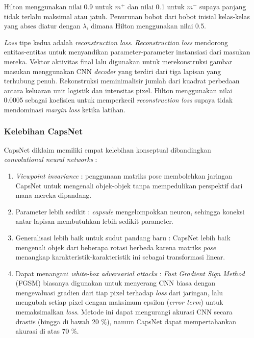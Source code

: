 \documentclass{article}
\begin{document}
		   	
		Hilton menggunakan nilai 0.9 untuk $m^{+}$ dan nilai 0.1 untuk $m^{-}$ supaya panjang tidak terlalu maksimal atau jatuh. Penurunan bobot dari bobot inisial kelas-kelas yang abses diatur dengan $\lambda$, dimana Hilton menggunakan nilai 0.5. 
	   	\par 
	   	\textit{Loss} tipe kedua adalah \textit{reconstruction loss}. \textit{Reconstruction loss} mendorong entitas-entitas untuk  menyandikan parameter-parameter instansiasi dari masukan mereka. Vektor aktivitas final lalu digunakan untuk merekonstruksi gambar masukan menggunakan CNN \textit{decoder} yang terdiri dari tiga lapisan yang terhubung penuh. Rekonstruksi meminimalisir jumlah dari kuadrat perbedaan antara keluaran unit logistik dan intensitas pixel. Hilton menggunakan nilai 0.0005 sebagai koefisien untuk memperkecil \textit{reconstruction loss} supaya tidak mendominasi \textit{margin loss} ketika latihan. 
	   	
	   	\subsubsection{Kelebihan CapsNet}
	   	CapsNet diklaim memiliki empat kelebihan konseptual dibandingkan \textit{convolutional neural networks} :
	   	
	   	\begin{enumerate}
	   	 \item \textit{Viewpoint invariance} : penggunaan matriks pose membolehkan jaringan CapsNet untuk mengenali objek-objek tanpa mempedulikan perspektif dari mana mereka dipandang.
	   	 \item Parameter lebih sedikit : \textit{capsule} mengelompokkan neuron, sehingga koneksi antar lapisan membutuhkan lebih sedikit parameter.
	   	 \item Generalisasi lebih baik untuk sudut pandang baru : CapsNet lebih baik mengenali objek dari beberapa rotasi berbeda karena matriks \textit{pose} menangkap karakteristik-karakteristik ini sebagai transformasi linear.
	   	 \item Dapat menangani \textit{white-box adversarial attacks} : \textit{Fast Gradient Sign Method} (FGSM) biasanya digunakan untuk menyerang CNN biasa dengan mengevaluasi gradien dari tiap pixel terhadap \textit{loss} dari jaringan, lalu mengubah setiap pixel dengan maksimum epsilon (\textit{error term}) untuk memaksimalkan \textit{loss}. Metode ini dapat mengurangi akurasi CNN secara drastis (hingga di bawah 20 \%), namun CapsNet dapat mempertahankan akurasi di atas 70 \%. 
	   	\end{enumerate}
   	
\end{document}
